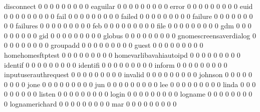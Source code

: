 \documentclass[compress,8pt]{beamer}
\begin{document}
\begin{frame}
\begin{Schunk}
  disconnect                                 0   0   0   0   0   0   0   0   0
  eaguilar                                   0   0   0   0   0   0   0   0   0
  error                                      0   0   0   0   0   0   0   0   0
  euid                                       0   0   0   0   0   0   0   0   0
  fail                                       0   0   0   0   0   0   0   0   0
  failed                                     0   0   0   0   0   0   0   0   0
  failure                                    0   0   0   0   0   0   0   0   0
  failures                                   0   0   0   0   0   0   0   0   0
  feb                                        0   0   0   0   0   0   0   0   0
  file                                       0   0   0   0   0   0   0   0   0
  gdm                                        0   0   0   0   0   0   0   0   0
  gid                                        0   0   0   0   0   0   0   0   0
  globus                                     0   0   0   0   0   0   0   0   0
  gnomescreensaverdialog                     0   0   0   0   0   0   0   0   0
  groupadd                                   0   0   0   0   0   0   0   0   0
  guest                                      0   0   0   0   0   0   0   0   0
  homehomesftptest                           0   0   0   0   0   0   0   0   0
  homevarlibavahiautoipd                     0   0   0   0   0   0   0   0   0
  identif                                    0   0   0   0   0   0   0   0   0
  identifi                                   0   0   0   0   0   0   0   0   0
  inform                                     0   0   0   0   0   0   0   0   0
  inputuserauthrequest                       0   0   0   0   0   0   0   0   0
  invalid                                    0   0   0   0   0   0   0   0   0
  johnson                                    0   0   0   0   0   0   0   0   0
  jone                                       0   0   0   0   0   0   0   0   0
  jun                                        0   0   0   0   0   0   0   0   0
  lee                                        0   0   0   0   0   0   0   0   0
  linda                                      0   0   0   0   0   0   0   0   0
  listen                                     0   0   0   0   0   0   0   0   0
  login                                      0   0   0   0   0   0   0   0   0
  logname                                    0   0   0   0   0   0   0   0   0
  lognamerichard                             0   0   0   0   0   0   0   0   0
  mar                                        0   0   0   0   0   0   0   0   0

\end{Schunk}
\end{frame}
\end{document}
